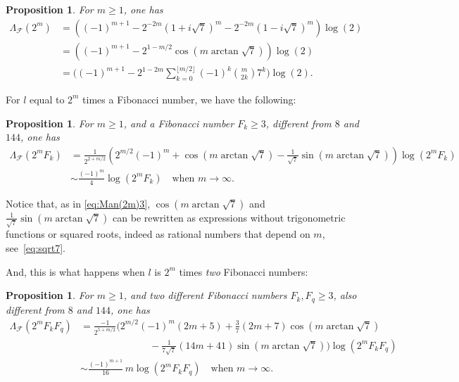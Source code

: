 \documentclass[11pt, a4paper]{article}
\newcommand{\manF}{\Lambda_{\mathcal{F}}}
\theoremstyle{plain}
\newtheorem{proposition}[theorem]{Proposition}
\theoremstyle{definition}
\begin{document}
\begin{proposition}
\label{prop:Man(2m)}
For $m \ge 1$, one has
\begin{align}
\label{eq:Man(2m)1}
  \manF(2^m) &= \left((-1)^{m+1} - 2^{-2m} (1+i\sqrt{7})^m 
  - 2^{-2m} (1-i\sqrt{7})^m\right) \log(2) \\
\label{eq:Man(2m)2}
  &= \left( (-1)^{m+1} - 2^{1-m/2} \cos(m \arctan\sqrt{7}) \right) \log(2) \\
\label{eq:Man(2m)3}
  &= \biggl( (-1)^{m+1} - 2^{1-2m} \sum_{k=0}^{\lfloor m/2 \rfloor} (-1)^k \binom{m}{2k} 7^k \biggr) \log(2).
\end{align}
\end{proposition}

For $l$ equal to $2^m$ times a Fibonacci number, we have the following:

\begin{proposition}
\label{prop:Man(2mFk)}
For $m \ge 1$, and a Fibonacci number $F_k \ge 3$, different from $8$ and $144$, one has
\begin{align*}
  \manF(2^m F_k) &= \frac{1}{2^{2+m/2}} \left(2^{m/2}(-1)^m + \cos(m \arctan\sqrt{7}) 
  - \frac{1}{\sqrt{7}} \sin(m \arctan\sqrt{7}) \right) \log(2^mF_k) \\
  &\sim \frac{(-1)^m}{4} \log(2^mF_k)
  \quad \text{when } m\to\infty.
\end{align*}
\end{proposition}

Notice that, as in \eqref{eq:Man(2m)3}, $\cos(m \arctan\sqrt{7})$ and $\frac{1}{\sqrt{7}} \sin(m \arctan\sqrt{7})$ can be rewritten as expressions without trigonometric functions or squared roots, indeed as rational numbers that depend on $m$, see~\eqref{eq:sqrt7}.

And, this is what happens when $l$ is $2^m$ times \emph{two} Fibonacci numbers:

\begin{proposition}
\label{prop:Man(2mFkFq)}
For $m \ge 1$, and two different Fibonacci numbers $F_k, F_q \ge 3$, also different from $8$ and $144$, one has
\begin{align*}
  \manF(2^m F_kF_q) &= \frac{-1}{2^{5+m/2}} \biggl(2^{m/2}(-1)^m(2m+5) 
  + \frac{3}{7}(2m+7) \cos(m \arctan\sqrt{7}) \\
  &\qquad\qquad\qquad\quad
  - \frac{1}{7\sqrt{7}} (14m+41) \sin(m \arctan\sqrt{7}) \biggr) \log(2^mF_kF_q) \\
  &\sim \frac{(-1)^{m+1}}{16} \,m \log(2^mF_kF_q)
  \quad \text{when } m\to\infty.
\end{align*}
\end{proposition}
\end{document}
